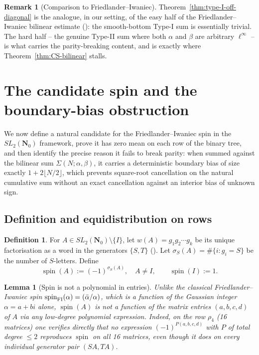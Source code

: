 \documentclass[11pt]{article}
\newtheorem{lemma}[theorem]{Lemma}
\theoremstyle{definition}
\newtheorem{definition}[theorem]{Definition}
\newtheorem{remark}[theorem]{Remark}
\newcommand{\Nz}{\mathbf{N}_0}
\newcommand{\SLNz}{SL_2(\Nz)}
\DeclareMathOperator{\spin}{spin}
\begin{document}
\begin{remark}[Comparison to Friedlander--Iwaniec]
Theorem~\ref{thm:type-I-off-diagonal} is the analogue, in our setting, of
the easy half of the Friedlander--Iwaniec bilinear estimate (\cite[\S4]{FI98b}):
the smooth-bottom Type-I sum is essentially trivial. The hard half --
the genuine Type-II sum where both $\alpha$ and $\beta$ are arbitrary
$\ell^{\infty}$ -- is what carries the parity-breaking content, and is
exactly where Theorem~\ref{thm:CS-bilinear} stalls.
\end{remark}

\section{The candidate spin and the boundary-bias obstruction}\label{sec:spin}

We now define a natural candidate for the Friedlander--Iwaniec spin in
the $\SLNz$ framework, prove it has zero mean on each row of the binary
tree, and then identify the precise reason it fails to break parity:
when summed against the bilinear sum $\Sigma(N;\alpha,\beta)$, it
carries a deterministic boundary bias of size exactly $1+2\lfloor N/2
\rfloor$, which prevents square-root cancellation on the natural
cumulative sum without an exact cancellation against an interior bias
of unknown sign.

\subsection{Definition and equidistribution on rows}

\begin{definition}\label{def:spin-on-SLNz}
For $A\in\SLNz\setminus\{I\}$, let $w(A)=g_{1}g_{2}\cdots g_{k}$ be its
unique factorisation as a word in the generators $\{S,T\}$
(\cite[Cor.~1.3]{shakov}). Let $\sigma_{S}(A)=\#\{i:g_{i}=S\}$ be the
number of $S$-letters. Define
\[
\spin(A):=(-1)^{\sigma_{S}(A)},\quad A\ne I,\qquad\spin(I):=1.
\]
\end{definition}

\begin{lemma}[Spin is not a polynomial in entries]\label{lem:spin-not-polynomial}
Unlike the classical Friedlander--Iwaniec spin
$\spin_{\textnormal{FI}}(\alpha)=(\bar\alpha/\alpha)$, which is a function
of the Gaussian integer $\alpha=a+bi$ alone, $\spin(A)$ is \emph{not} a
function of the matrix entries $(a,b,c,d)$ of $A$ via any low-degree
polynomial expression. Indeed, on the row $\rho_{4}$ (16 matrices) one
verifies directly that no expression $(-1)^{P(a,b,c,d)}$ with $P$ of
total degree $\le 2$ reproduces $\spin$ on all 16 matrices, even though
it does on every individual generator pair $(SA,TA)$.
\end{lemma}
\end{document}
